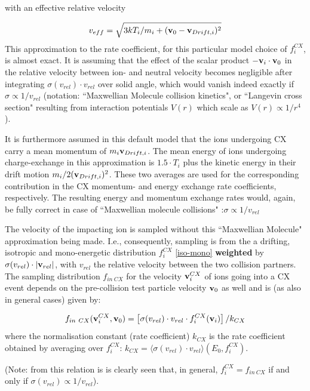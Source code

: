 with an effective relative velocity

\begin{displaymath}
  v_{eff} = \sqrt{3 kT_i/m_i + (\mathbf{v}_0 - \mathbf{v}_{Drift,i})^2}
\end{displaymath}
This approximation to the rate coefficient, for this
particular model choice of $f_i^{CX}$, is almost exact.
It is assuming that the effect of the scalar product $-\mathbf{v}_i\cdot \mathbf{v}_0$ in the
relative velocity between ion- and neutral velocity becomes negligible after
integrating $\sigma(v_{rel}) \cdot v_{rel}$ over solid angle, which would
vanish indeed exactly if $\sigma \propto 1/v_{rel}$  (notation: ``Maxwellian
Molecule collision kinetics", or ``Langevin cross section" resulting from
interaction potentials $V(r)$ which scale as $V(r) \propto 1/r^4$).

It is furthermore assumed in this default model that the ions undergoing CX
carry a mean momentum of $m_i \mathbf{v}_{Drift,i}$.
The mean energy of ions undergoing charge-exchange in this approximation is
$1.5 \cdot T_i$  plus the kinetic energy in their drift motion $m_i/2
  (\mathbf{v}_{Drift,i})^2$.
These two averages are used for the corresponding contribution in the CX
momentum- and energy exchange rate coefficients, respectively.
The resulting energy and momentum exchange rates would, again, be fully correct
in case of ``Maxwellian molecule collisions" :$\sigma \propto 1/v_{rel}$

The velocity of the impacting ion is sampled without this ``Maxwellian
Molecule" approximation being made.
I.e., consequently, sampling is from the a drifting, isotropic and
mono-energetic distribution $f_i^{CX}$ \cref{iso-mono} \textbf{weighted} by
$\sigma(v_{rel}) \cdot |\mathbf{v}_{rel}|$, with $v_{rel}$ the relative velocity
between the two collision partners.
The sampling distribution $f_{in \ CX}$ for the velocity $\mathbf{v}_i^{CX}$ of ions
going into a CX event depends on the pre-collision test particle velocity
$\mathbf{v}_0$ as well and is (as also in general cases) given by:

\begin{equation}
  f_{in \ CX}
  (\mathbf{v}_i^{CX},\mathbf{v}_0)= \left[\sigma(v_{rel}) \cdot v_{rel} \cdot
  f_i^{CX}(\mathbf{v}_i)\right] /k_{CX}
\end{equation}
where the normalisation constant
(rate coefficient) $k_{CX}$ is the rate coefficient obtained by averaging over
$f_i^{CX}$:
$k_{CX} = \langle\sigma(v_{rel}) \cdot v_{rel}\rangle(E_0,f_i^{CX})$.

(Note: from this relation is is clearly seen that, in general, $f_i^{CX} =
  f_{in \ CX}$ if and only if $\sigma(v_{rel}) \propto 1/v_{rel}$).

